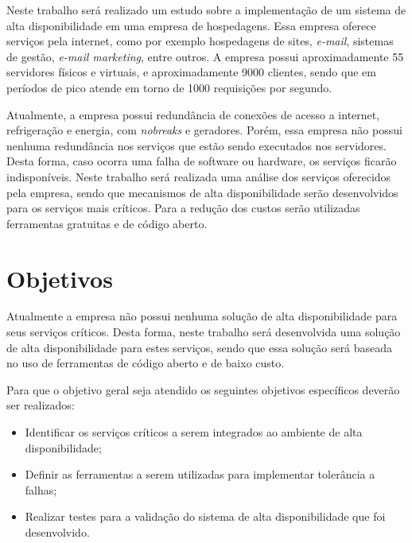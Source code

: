 Neste trabalho será realizado um estudo sobre a implementação de um sistema de alta disponibilidade em uma empresa de hospedagens. 
Essa empresa oferece serviços pela internet, como por exemplo hospedagens de sites, \textit{e-mail}, sistemas de gestão, \textit{e-mail marketing}, 
entre outros. A empresa possui aproximadamente 55 servidores físicos e virtuais, e aproximadamente 9000 clientes, 
sendo que em períodos de pico atende em torno de 1000 requisições por segundo. 

Atualmente, a empresa possui redundância de conexões de acesso a internet, refrigeração e energia, com \textit{nobreaks} e geradores. 
Porém, essa empresa não possui nenhuma redundância nos serviços que estão sendo executados nos servidores. Desta forma, 
caso ocorra uma falha de software ou hardware, os serviços ficarão indisponíveis. Neste trabalho será realizada uma análise dos serviços 
oferecidos pela empresa, sendo que mecanismos de alta disponibilidade serão desenvolvidos para os serviços mais críticos. 
Para a redução dos custos serão utilizadas ferramentas gratuitas e de código aberto.

\section{Objetivos}
Atualmente a empresa não possui nenhuma solução de alta disponibilidade para seus serviços críticos. 
Desta forma, neste trabalho será desenvolvida uma solução de alta disponibilidade para estes serviços, 
sendo que essa solução será baseada no uso de ferramentas de código aberto e de baixo custo.

Para que o objetivo geral seja atendido os seguintes objetivos específicos deverão ser realizados:

\begin{itemize}
\item Identificar os serviços críticos a serem integrados ao ambiente de alta disponibilidade;
\item Definir as ferramentas a serem utilizadas para implementar tolerância a falhas;
\item Realizar testes para a validação do sistema de alta disponibilidade que foi desenvolvido.
\end{itemize}
